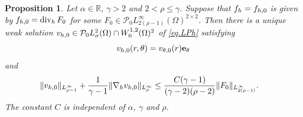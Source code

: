 \documentclass[10pt,a4paper]{amsart}
\newtheorem{proposition}{Proposition}
\newcommand{\R}{\mathbb{R}}
\newcommand{\h}{{\rm h}}
\newcommand{\opdiv}{\operatorname{div}}
\begin{document}
\begin{proposition}\label{prop.LPh.zero}
Let $\alpha\in\R$, $\gamma>2$ and $2<\rho\le\gamma$. Suppose that $f_\h=f_{\h,0}$ is given by $f_{\h,0}=\opdiv_\h F_0$ for some $F_0\in {\mathcal P}_0 L^\infty_{2(\rho-1)}(\Omega)^{2\times2}$. Then there is a unique weak solution $v_{\h,0}\in {\mathcal P}_0 L^2_\sigma(\Omega) \cap W^{1,2}_0(\Omega)^2$ of \eqref{eq.LPh} satisfying 
\[
v_{\h,0}(r,\theta)=v_{\theta,0}(r) {\bf e}_\theta
\]
and 
%
\begin{align}\label{est1.prop.LPh.zero}
\|v_{\h,0}\|_{L^\infty_{\rho-1}} 
+ \frac{1}{\gamma-1} 
\|\nabla_\h v_{\h,0}\|_{L^\infty_{\rho}} 
&\le 
\frac{C(\gamma-1)}{(\gamma-2)(\rho-2)} 
\|F_0\|_{L^\infty_{2(\rho-1)}}. 
\end{align}
%
The constant $C$ is independent of $\alpha$, $\gamma$ and $\rho$.
\end{proposition}
\end{document}
